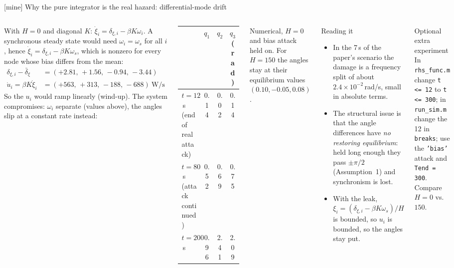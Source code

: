 \documentclass[aspectratio=169,9pt]{beamer}
\begin{document}
\begin{frame}[t]{[mine] Why the pure integrator is the real hazard: differential-mode drift}
\footnotesize
\begin{columns}[T]
With $H=0$ and diagonal $K$: $\dot\xi_i=\delta_{\xi,i}-\beta K\omega_i$. A synchronous steady state would need $\omega_i=\omega_s$ for all $i$, hence $\dot\xi_i=\delta_{\xi,i}-\beta K\omega_s$, which is nonzero for every node whose bias differs from the mean:
\begin{align*}
\delta_{\xi,i}-\bar\delta_\xi&=(+2.81,\,+1.56,\,-0.94,\,-3.44)\\
\dot u_i=\beta K\dot\xi_i&=(+563,\,+313,\,-188,\,-688)\ \text{W/s}
\end{align*}
So the $u_i$ would ramp linearly (wind-up). The system compromises: $\omega_i$ separate (values above), the angles slip at a constant rate instead:
\begin{center}
\begin{tabular}{@{}lccc@{}}
\toprule
 & $q_1$ & $q_2$ & $q_3$ (rad)\\
\midrule
$t=12$\,s (end of real attack) & 0.14 & 0.02 & 0.14\\
$t=80$\,s (attack continued) & 0.52 & 0.69 & 0.75\\
$t=200$\,s & 0.96 & 2.41 & 2.09\\
\bottomrule
\end{tabular}
\end{center}
{\scriptsize Numerical, $H=0$ and bias attack held on. For $H=150$ the angles stay at their equilibrium values $(0.10,-0.05,0.08)$.}
\begin{block}{Reading it}
\begin{itemize}
\item In the 7\,s of the paper's scenario the damage is a frequency split of about $2.4\times10^{-2}$\,rad/s, small in absolute terms.
\item The structural issue is that the angle differences have \emph{no restoring equilibrium}: held long enough they pass $\pm\pi/2$ (Assumption~1) and synchronism is lost.
\item With the leak, $\xi_i=(\delta_{\xi,i}-\beta K\omega_s)/H$ is bounded, so $u_i$ is bounded, so the angles stay put.
\end{itemize}
\end{block}
\begin{exampleblock}{Optional extra experiment}
In \texttt{rhs\_func.m} change \texttt{t <= 12} to \texttt{t <= 300}; in \texttt{run\_sim.m} change the 12 in \texttt{breaks}; use the \texttt{'bias'} attack and \texttt{Tend = 300}. Compare $H=0$ vs.\ $150$.
\end{exampleblock}
\end{columns}
\end{frame}
\end{document}
